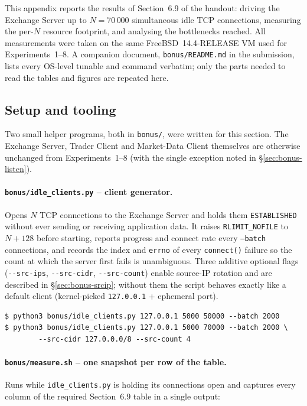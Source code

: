 \documentclass[11pt,a4paper]{article}
\begin{document}
This appendix reports the results of Section~6.9 of the handout: driving the Exchange
Server up to $N=70\,000$ simultaneous idle TCP connections, measuring the per-$N$
resource footprint, and analysing the bottlenecks reached.  All measurements were taken
on the same FreeBSD~14.4-RELEASE VM used for Experiments~1--8.  A companion document,
\texttt{bonus/README.md} in the submission, lists every OS-level tunable and command
verbatim; only the parts needed to read the tables and figures are repeated here.

\subsection{Setup and tooling}

Two small helper programs, both in \texttt{bonus/}, were written for this section.  The
Exchange Server, Trader Client and Market-Data Client themselves are otherwise unchanged
from Experiments~1--8 (with the single exception noted in \S\ref{sec:bonus-listen}).

\paragraph{\texttt{bonus/idle\_clients.py} -- client generator.}  Opens $N$ TCP
connections to the Exchange Server and holds them \texttt{ESTABLISHED} without ever
sending or receiving application data.  It raises \texttt{RLIMIT\_NOFILE} to $N+128$
before starting, reports progress and connect rate every \texttt{--batch} connections,
and records the index and \texttt{errno} of every \texttt{connect()} failure so the
count at which the server first fails is unambiguous.  Three additive optional flags
(\texttt{-{}-src-ips}, \texttt{-{}-src-cidr}, \texttt{-{}-src-count}) enable
source-IP rotation and are described in \S\ref{sec:bonus-srcip}; without them the
script behaves exactly like a default client (kernel-picked \texttt{127.0.0.1} +
ephemeral port).

\begin{lstlisting}
$ python3 bonus/idle_clients.py 127.0.0.1 5000 50000 --batch 2000
$ python3 bonus/idle_clients.py 127.0.0.1 5000 70000 --batch 2000 \
        --src-cidr 127.0.0.0/8 --src-count 4
\end{lstlisting}

\paragraph{\texttt{bonus/measure.sh} -- one snapshot per row of the table.}  Runs
while \texttt{idle\_clients.py} is holding its connections open and captures every
column of the required Section~6.9 table in a single output:
\end{document}
